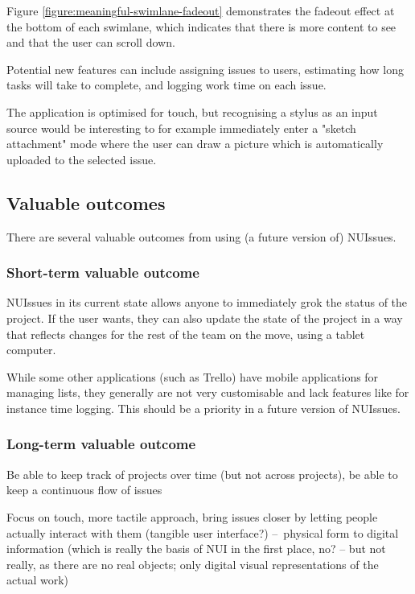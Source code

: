 Figure \ref{figure:meaningful-swimlane-fadeout} demonstrates the fadeout effect at the bottom of each swimlane, which indicates that there is more content to see and that the user can scroll down.

Potential new features can include assigning issues to users, estimating how long tasks will take to complete, and logging work time on each issue.

The application is optimised for touch, but recognising a stylus as an input source would be interesting to for example immediately enter a "sketch attachment" mode where the user can draw a picture which is automatically uploaded to the selected issue.

\subsection{Valuable outcomes}

There are several valuable outcomes from using (a future version of) NUIssues.

\subsubsection{Short-term valuable outcome}

NUIssues in its current state allows anyone to immediately grok the status of the project. If the user wants, they can also update the state of the project in a way that reflects changes for the rest of the team on the move, using a tablet computer.

While some other applications (such as Trello) have mobile applications for managing lists, they generally are not very customisable and lack features like for instance time logging. This should be a priority in a future version of NUIssues.

\subsubsection{Long-term valuable outcome}

Be able to keep track of projects over time (but not across projects), be able to keep a continuous flow of issues %

Focus on touch, more tactile approach, bring issues closer by letting people actually interact with them (tangible user interface?) – physical form to digital information (which is really the basis of NUI in the first place, no? – but not really, as there are no real objects; only digital visual representations of the actual work)
